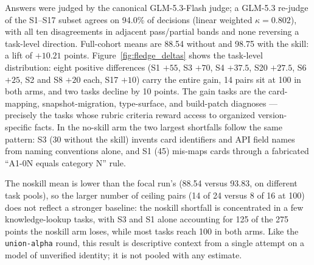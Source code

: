 \documentclass[11pt]{article}
\begin{document}
Answers were judged by the canonical GLM-5.3-Flash judge; a GLM-5.3 re-judge of the S1--S17 subset agrees on 94.0\% of decisions (linear weighted $\kappa = 0.802$), with all ten disagreements in adjacent pass/partial bands and none reversing a task-level direction. Full-cohort means are 88.54 without and 98.75 with the skill: a lift of $+10.21$ points. Figure~\ref{fig:fledge_deltas} shows the task-level distribution: eight positive differences (S1 $+55$, S3 $+70$, S4 $+37.5$, S20 $+27.5$, S6 $+25$, S2 and S8 $+20$ each, S17 $+10$) carry the entire gain, 14 pairs sit at 100 in both arms, and two tasks decline by 10 points. The gain tasks are the card-mapping, snapshot-migration, type-surface, and build-patch diagnoses --- precisely the tasks whose rubric criteria reward access to organized version-specific facts. In the no-skill arm the two largest shortfalls follow the same pattern: S3 (30 without the skill) invents card identifiers and API field names from naming conventions alone, and S1 (45) mis-maps cards through a fabricated ``A1-0N equals category N'' rule.

The noskill mean is lower than the focal run's (88.54 versus 93.83, on different task pools), so the larger number of ceiling pairs (14 of 24 versus 8 of 16 at 100) does not reflect a stronger baseline: the noskill shortfall is concentrated in a few knowledge-lookup tasks, with S3 and S1 alone accounting for 125 of the 275 points the noskill arm loses, while most tasks reach 100 in both arms. Like the \texttt{union-alpha} round, this result is descriptive context from a single attempt on a model of unverified identity; it is not pooled with any estimate.
\end{document}
